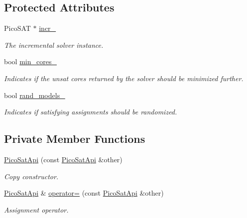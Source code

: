 \subsection*{Protected Attributes}
\begin{DoxyCompactItemize}
\item 
Pico\-S\-A\-T $\ast$ \hyperlink{classPicoSatApi_ae056afcfe07c468fd5b1488dc6f6e48d}{incr\-\_\-}
\begin{DoxyCompactList}\small\item\em The incremental solver instance. \end{DoxyCompactList}\item 
bool \hyperlink{classSatSolver_adfeecebfd09606c82b5c57cfe5aad813}{min\-\_\-cores\-\_\-}
\begin{DoxyCompactList}\small\item\em Indicates if the unsat cores returned by the solver should be minimized further. \end{DoxyCompactList}\item 
bool \hyperlink{classSatSolver_a73fed24d8fb4da85ef82dc53ac5f28c7}{rand\-\_\-models\-\_\-}
\begin{DoxyCompactList}\small\item\em Indicates if satisfying assignments should be randomized. \end{DoxyCompactList}\end{DoxyCompactItemize}
\subsection*{Private Member Functions}
\begin{DoxyCompactItemize}
\item 
\hyperlink{classPicoSatApi_a1d8cc76c346d85c8188db98793da93f9}{Pico\-Sat\-Api} (const \hyperlink{classPicoSatApi}{Pico\-Sat\-Api} \&other)
\begin{DoxyCompactList}\small\item\em Copy constructor. \end{DoxyCompactList}\item 
\hyperlink{classPicoSatApi}{Pico\-Sat\-Api} \& \hyperlink{classPicoSatApi_a17129e670ec8bb5d43f34c49a8b6ed87}{operator=} (const \hyperlink{classPicoSatApi}{Pico\-Sat\-Api} \&other)
\begin{DoxyCompactList}\small\item\em Assignment operator. \end{DoxyCompactList}\end{DoxyCompactItemize}


